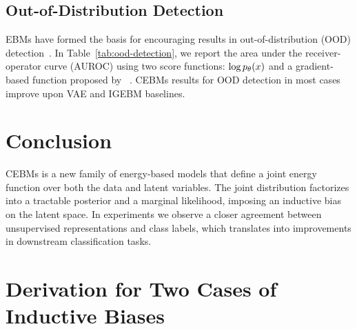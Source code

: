 \documentclass[tablecaption=bottom,wcp]{jmlr} %
\begin{document}
\subsection{Out-of-Distribution Detection}
\label{sec:ood}
\vspace*{-1.5ex}
EBMs have formed the basis for encouraging results in out-of-distribution (OOD) detection~\cite{du2019implicit,grathwohl2019your}. In Table~\ref{tab:ood-detection}, we report the area under the receiver-operator curve (AUROC) using two score functions: $\log p_\theta(x)$ and a gradient-based function proposed by ~\citet{grathwohl2019your}. CEBMs results for OOD detection in most cases improve upon VAE and IGEBM baselines.

\vspace*{-0.45ex}
\section{Conclusion}
\label{sec:conclusion}
\vspace*{-0.45ex}

CEBMs is a new family of energy-based models that define a joint energy function over both the data and latent variables. The joint distribution factorizes into a tractable posterior and a marginal likelihood, imposing an inductive bias on the latent space. In experiments we observe a closer agreement between unsupervised representations and class labels, which translates into improvements in downstream classification tasks. 




\appendix
\newpage
\section{Derivation for Two Cases of Inductive Biases}
\label{appendix-sec:inductive-bias}
\end{document}
